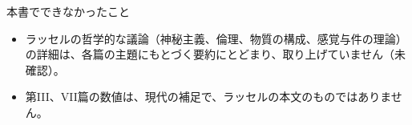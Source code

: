 \documentclass[a4paper,11pt,openany]{ltjsbook}
\begin{document}
\begin{notebox}{本書でできなかったこと}
\begin{itemize}[leftmargin=*]
\item ラッセルの哲学的な議論（神秘主義、倫理、物質の構成、感覚与件の理論）の詳細は、各篇の主題にもとづく要約にとどまり、取り上げていません（未確認）。
\item 第III、VII篇の数値は、現代の補足で、ラッセルの本文のものではありません。
\end{itemize}
\end{notebox}
\end{document}
